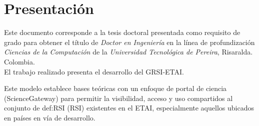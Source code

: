 \part*{Presentación}\label{parte:Presentacion}

Este documento corresponde a la tesis doctoral presentada como requisito de grado para obtener el título de \textit{Doctor en Ingeniería} en la línea de profundización \textit{Ciencias de la Computación} de la \textit{Universidad Tecnológica de Pereira}, Risaralda. Colombia.\\

El trabajo realizado presenta el desarrollo del \acrfull{GRSI-ETAI}.

 Este modelo establece bases teóricas con un enfoque de portal de ciencia (\gls{ScienceGateway}) para permitir la visibilidad, acceso y uso compartidos al conjunto de \gls{def:RSI} (\acrshort{RSI}) existentes en el \acrfull{ETAI}, especialmente aquellos ubicados en países en vía de desarrollo.  \\

%
